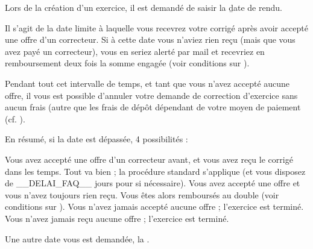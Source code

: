 Lors de la création d'un exercice, il est demandé de saisir la \b{date de rendu}.

Il s'agit de la date limite à laquelle vous recevrez votre corrigé après avoir accepté une offre d'un correcteur.
Si à cette date vous n'aviez rien reçu (mais que vous avez payé un correcteur), vous en seriez alerté par mail et recevriez en remboursement deux fois la somme engagée (voir conditions sur ).

Pendant tout cet intervalle de temps, et tant que vous n'avez accepté aucune offre, il vous est possible d'annuler votre demande de correction d'exercice sans aucun frais (autre que les frais de dépôt dépendant de votre moyen de paiement (cf. ).

En résumé, si la date est dépassée, 4 possibilités :
\begin{enumerate}
\li Vous avez accepté une offre d'un correcteur avant, et vous avez reçu le corrigé dans les temps. Tout va bien ; la procédure standard s'applique (et vous disposez de __DELAI_FAQ__  jours pour  si nécessaire).
\li Vous avez accepté une offre et vous n'avez toujours rien reçu. Vous êtes alors remboursés au double  (voir conditions sur ).
\li Vous n'avez jamais accepté aucune offre ; l'exercice est terminé.
\li Vous n'avez jamais reçu aucune offre ; l'exercice est terminé.
\end{enumerate}

Une autre date vous est demandée, la .